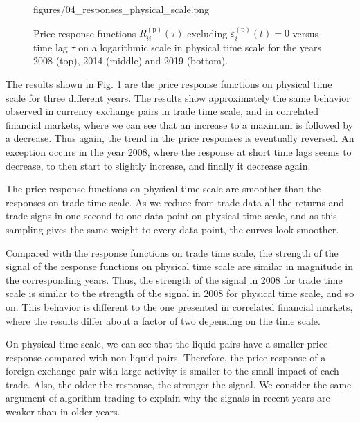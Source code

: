 \begin{figure}[htbp]
    {figures/04_responses_physical_scale.png}
    \caption{Price response functions
             $R^{\left(\textrm{p}\right)}_{ii}\left(\tau\right)$ excluding
             $\varepsilon^{\left(\textrm{p}\right)}_{i}\left(t\right) = 0$ versus time
             lag $\tau$ on a logarithmic scale in physical time scale for the
             years 2008 (top), 2014 (middle) and 2019 (bottom).}
    \label{fig:response_function_physical_scale}
\end{figure}
The results shown in Fig. \ref{fig:response_function_physical_scale} are the
price response functions on physical time scale for three different years. The
results show approximately the same behavior observed in currency exchange
pairs in trade time scale, and in correlated financial markets, where we can
see that an increase to a maximum is followed by a decrease. Thus again, the
trend in the price responses is eventually reversed. An exception occurs in the
year 2008, where the response at short time lags seems to decrease, to then
start to slightly increase, and finally it decrease again.

The price response functions on physical time scale are smoother than the
responses on trade time scale. As we reduce from trade data all the returns and
trade signs in one second to one data point on physical time scale, and as this
sampling gives the same weight to every data point, the curves look smoother.

Compared with the response functions on trade time scale, the strength of the
signal of the response functions on physical time scale are similar in
magnitude in the corresponding years. Thus, the strength of the signal in 2008
for trade time scale is similar to the strength of the signal in 2008 for
physical time scale, and so on. This behavior is different to the one presented
in correlated financial markets, where the results differ about a factor of
two depending on the time scale.

On physical time scale, we can see that the liquid pairs have a smaller price
response compared with non-liquid pairs. Therefore, the price response of a
foreign exchange pair with large activity is smaller to the small impact of
each trade. Also, the older the response, the stronger the signal. We consider
the same argument of algorithm trading to explain why the signals in recent
years are weaker than in older years.
